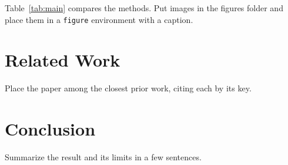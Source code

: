 Table~\ref{tab:main} compares the methods. Put images in the figures
folder and place them in a \texttt{figure} environment with a caption.

\section{Related Work}
\label{sec:related}

Place the paper among the closest prior work, citing each by its key.

\section{Conclusion}
\label{sec:conclusion}

Summarize the result and its limits in a few sentences.





